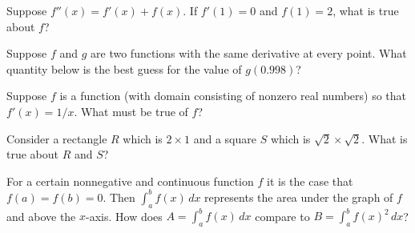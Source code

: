 \documentclass{ximera}
\newcommand{\recommendation}[1]{}
\begin{document}
\begin{problem}
  Suppose $f''(x) = f'(x) + f(x)$.  If $f'(1) = 0$ and $f(1) = 2$, what is true about $f$?
  \begin{multipleChoice}
  \end{multipleChoice}
\end{problem}

\begin{problem}
\recommendation{Vic}
  Suppose $f$ and $g$ are two functions with the same derivative at every point.  What quantity below is the best guess for the value of $g(0.998)$?
  \begin{multipleChoice}
  \end{multipleChoice}
\end{problem}


\begin{problem}
  Suppose $f$ is a function (with domain consisting of nonzero real numbers) so that $f'(x) = 1/x$.  What must be true of $f$?
  \begin{multipleChoice}
  \end{multipleChoice}
\end{problem}


\begin{problem}
  Consider a rectangle $R$ which is $2 \times 1$ and a square $S$
  which is $\sqrt{2} \times \sqrt{2}$.  What is true about $R$ and
  $S$?
  \begin{multipleChoice}
  \end{multipleChoice}
\end{problem}

\begin{problem}
  For a certain nonnegative and continuous function $f$ it is the case
  that $f(a) = f(b) = 0$.  Then $\int_a^b f(x) \, dx$ represents the
  area under the graph of $f$ and above the $x$-axis.  How does $A = \int_a^b f(x) \, dx$ compare to $B = \int_a^b f(x)^2 \, dx$?
  \begin{multipleChoice}
  \end{multipleChoice}
\end{problem}
\end{document}
